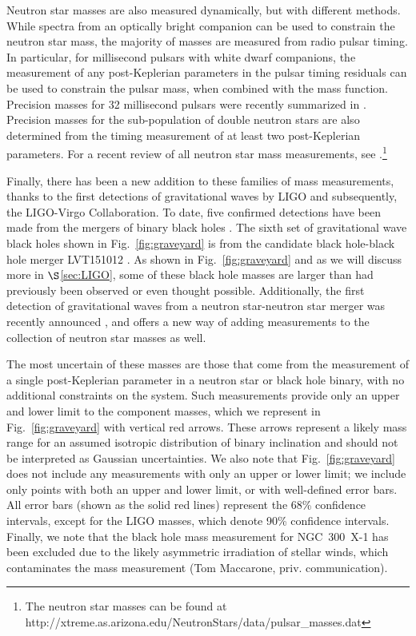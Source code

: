 \documentclass[]{emulateapj}
\begin{document}
Neutron star masses are also measured dynamically, but with different methods. While spectra from an optically bright companion can be used to constrain the neutron star mass, the majority of masses are measured from radio pulsar timing. In particular, for millisecond pulsars with white dwarf companions, the measurement of any post-Keplerian parameters in the pulsar timing residuals can be used to constrain the pulsar mass, when combined with the mass function. Precision masses for 32 millisecond pulsars were recently summarized in \citet{Antoniadis2016}. Precision masses for the sub-population of double neutron stars are also determined from the timing measurement of at least two post-Keplerian parameters. For a recent review of all neutron star mass measurements, see \citet{Ozel2016}.\footnote{The neutron star masses can be found at http://xtreme.as.arizona.edu/NeutronStars/data/pulsar\_masses.dat}

Finally, there has been a new addition to these families of mass measurements, thanks to the first detections of gravitational waves by LIGO and subsequently, the LIGO-Virgo Collaboration. To date, five confirmed detections have been made from the mergers of binary black holes \citep{Abbott2016b,Abbott2016,Abbott2017,GW170608, LIGOVirgo2017}. The sixth set of gravitational wave black holes shown in Fig.~\ref{fig:graveyard} is from the candidate black hole-black hole merger LVT151012 \citep{Abbott2016c}. As shown in Fig.~\ref{fig:graveyard} and as we will discuss more in $\S$\ref{sec:LIGO}, some of these black hole masses are larger than had previously been observed or even thought possible. Additionally, the first detection of gravitational waves from a neutron star-neutron star merger was recently announced \citep{Abbott2017a}, and offers a new way of adding measurements to the collection of neutron star masses as well.

The most uncertain of these masses are those that come from the measurement of a single post-Keplerian parameter in a neutron star or black hole binary, with no additional constraints on the system. Such measurements provide only an upper and lower limit to the component masses, which we represent in Fig.~\ref{fig:graveyard} with vertical red arrows. These arrows represent a likely mass range for an assumed isotropic distribution of binary inclination and should not be interpreted as Gaussian uncertainties. We also note that Fig.~\ref{fig:graveyard} does not include any measurements with only an upper or lower limit; we include only points with both an upper and lower limit, or with well-defined error bars. All error bars (shown as the solid red lines) represent the 68\% confidence intervals, except for the LIGO masses, which denote 90\% confidence intervals. Finally, we note that the black hole mass measurement for NGC~300~X-1 has been excluded due to the likely asymmetric irradiation of stellar winds, which contaminates the mass measurement (Tom Maccarone, priv. communication).
\end{document}
